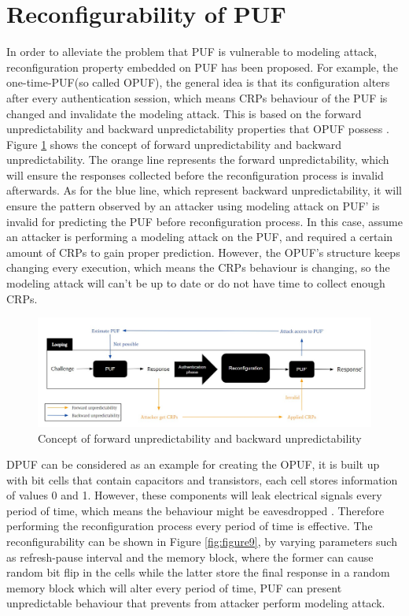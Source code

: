 \section{Reconfigurability of PUF}
In order to alleviate the problem that PUF is vulnerable to modeling attack, reconfiguration property embedded on PUF has been proposed. For example, the one-time-PUF(so called 
OPUF), the general idea is that its configuration alters after every authentication session, which means CRPs behaviour of the PUF is changed and invalidate the modeling attack. This is based on the
forward unpredictability and backward unpredictability properties that OPUF possess \cite{Reference7}. Figure \ref{fig:figure8} shows the concept of forward unpredictability and backward unpredictability.
The orange line represents the forward unpredictability, which will ensure the responses collected before the reconfiguration process is invalid afterwards. As for the blue line, 
which represent backward unpredictability, it will ensure the pattern observed by an attacker using modeling attack on PUF' is invalid for predicting the PUF before reconfiguration process. 
In this case, assume an attacker is performing a modeling attack on the PUF, and required a certain amount of CRPs to gain proper prediction. However, the OPUF's structure keeps changing every execution, which means the CRPs 
behaviour is changing, so the modeling attack will can't be up to date or do not have time to collect enough CRPs.
\begin{figure}[htp]
    \centering
    \includegraphics[width=14cm]{figures/figure8.jpg}
    \caption{Concept of forward unpredictability and backward unpredictability}
    \label{fig:figure8}
    \end{figure}

DPUF can be considered as an example for creating the OPUF, it is built up with bit cells that contain capacitors and transistors, each cell stores information of values 0 and 1. However, these components will leak 
electrical signals every period of time, which means the behaviour might be eavesdropped \cite{Reference7}. Therefore performing the reconfiguration process every period of time is effective. The reconfigurability can be shown in Figure \ref{fig:figure9}, by varying parameters
such as refresh-pause interval and the memory block, where the former can cause random bit flip in the cells while the latter store the final response in a random memory block 
which will alter every period of time, PUF can present unpredictable behaviour that prevents from attacker perform modeling attack.

